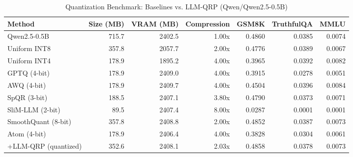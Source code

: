 \begin{table}[htbp]
  \centering
  \small
  \caption{Quantization Benchmark: Baselines vs. LLM-QRP (Qwen/Qwen2.5-0.5B)}
  \label{tab:benchmark}
  \begin{tabular}{lrrrrrr}
    \toprule
    \textbf{Method} & \textbf{Size (MB)} & \textbf{VRAM (MB)} & \textbf{Compression} & \textbf{GSM8K} & \textbf{TruthfulQA} & \textbf{MMLU} \\
    \midrule
    Qwen2.5-0.5B & 715.7 & 2402.5 & 1.00x & 0.4860 & 0.0385 & 0.0074 \\
    Uniform INT8 & 357.8 & 2057.7 & 2.00x & 0.4776 & 0.0389 & 0.0067 \\
    Uniform INT4 & 178.9 & 1895.2 & 4.00x & 0.3965 & 0.0392 & 0.0082 \\
    GPTQ (4-bit) & 178.9 & 2409.0 & 4.00x & 0.3915 & 0.0278 & 0.0051 \\
    AWQ (4-bit) & 178.9 & 2409.7 & 4.00x & 0.4504 & 0.0396 & 0.0084 \\
    SpQR (3-bit) & 188.5 & 2407.1 & 3.80x & 0.4790 & 0.0373 & 0.0071 \\
    SliM-LLM (2-bit) & 89.5 & 2407.4 & 8.00x & 0.0287 & 0.0001 & 0.0001 \\
    SmoothQuant (8-bit) & 357.8 & 2408.8 & 2.00x & 0.4852 & 0.0387 & 0.0073 \\
    Atom (4-bit) & 178.9 & 2406.4 & 4.00x & 0.3828 & 0.0304 & 0.0061 \\
    \midrule
    +LLM-QRP (quantized) & 352.6 & 2408.1 & 2.03x & 0.4858 & 0.0378 & 0.0073 \\
    \bottomrule
  \end{tabular}
\end{table}
